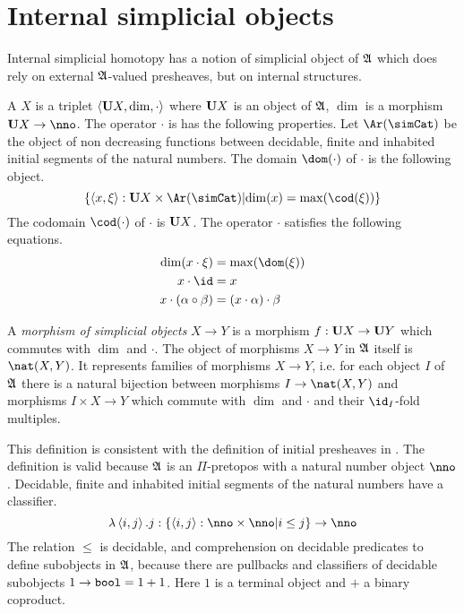 \documentclass[csh.tex]{subfiles}
\begin{document}
\section{Internal simplicial objects}
Internal simplicial homotopy has a notion of simplicial object of $\mathfrak A$ which does rely on external $\mathfrak A$-valued presheaves, but on internal structures.

\begin{definition} A  $X$ is a triplet $\left\langle \mathbf{U} X, \dim, \cdot \right\rangle$ where $\mathbf{U} X$ is an object of $\mathfrak A$, $\dim$ is a morphism $\base X\to \nno$. The operator $\cdot$ is has the following properties. Let $\Ar(\simCat)$ be the object of non decreasing functions between decidable, finite and inhabited initial segments of the natural numbers. The domain $\dom(\cdot)$ of $\cdot$ is the following object. 
\[ \set{\tuplet{x,\xi}\of \base X\times \Ar(\simCat)\middle| \dim(x) = \max(\cod(\xi))}\]
The codomain $\cod(\cdot)$ of $\cdot$ is $\mathbf{U} X$. The operator $\cdot$ satisfies the following equations.
\begin{align*}
\dim(x\cdot\xi) &= \max(\dom(\xi))\\
x\cdot \id &= x \\
x\cdot(\alpha\circ\beta)&=(x\cdot\alpha)\cdot\beta 
\end{align*}

A \emph{morphism of simplicial objects} $X\to Y$ is a morphism $f:\mathbf{U} X\to\mathbf{U} Y$ which commutes with $\dim$ and $\cdot$. The object of morphisms $X\to Y$ in $\mathfrak A$ itself is $\nat(X,Y)$. It represents families of morphisms $X\to Y$, i.e. for each object $I$ of $\mathfrak A$ there is a natural bijection between morphisms $I\to \nat(X,Y)$ and morphisms $I\times X\to Y$ which commute with $\dim$ and $\cdot$ and their $\id_I$-fold multiples.
\end{definition}

This definition is consistent with the definition of initial presheaves in \citep{MR1300636}. The definition is valid because $\mathfrak A$ is an $\Pi$-pretopos with a natural number object $\nno$. Decidable, finite and inhabited initial segments of the natural numbers have a classifier.
\[  \lambda\tuplet{i,j}.j\of\set{\tuplet{i,j}\of\nno\times\nno\middle|i\leq j}\to \nno \]
The relation $\leq$ is decidable, and comprehension on decidable predicates to define subobjects in $\mathfrak A$, because there are pullbacks and classifiers of decidable subobjects $1\to \mathtt{bool} = 1+1$. Here $1$ is a terminal object and $+$ a binary coproduct.
\end{document}
